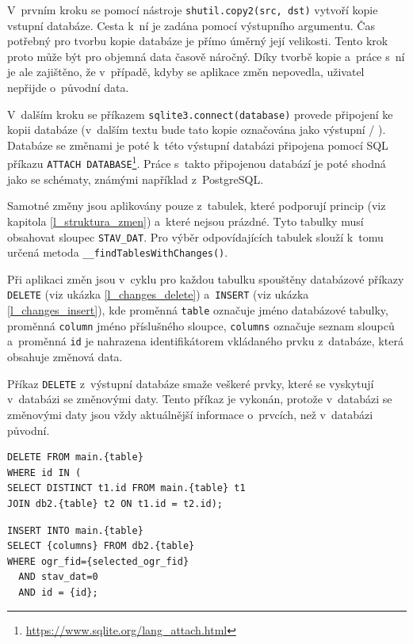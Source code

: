 \documentclass[a4paper,12pt,oneside]{book}
\begin{document}
V~prvním kroku se pomocí nástroje \texttt{shutil.copy2(src, dst)}
vytvoří kopie vstupní databáze. Cesta k~ní je zadána pomocí výstupního
argumentu. Čas potřebný pro tvorbu kopie databáze je přímo úměrný její
velikosti. Tento krok proto může být pro objemná data časově
náročný. Díky tvorbě kopie a~práce s~ní je ale zajištěno, že
v~případě, kdyby se aplikace změn nepovedla, uživatel nepřijde
o~původní data.

V~dalším kroku se příkazem \texttt{sqlite3.connect(database)} provede
připojení ke kopii databáze (v~dalším textu bude tato kopie označována
jako výstupní / ). Databáze se změnami je poté k~této výstupní
databázi připojena pomocí SQL příkazu \texttt{ATTACH
  DATABASE}\footnote{\url{https://www.sqlite.org/lang\_attach.html}}. Práce
s~takto připojenou databází je poté shodná jako se schématy, známými
například z~PostgreSQL.

Samotné změny jsou aplikovány pouze z~tabulek, které podporují princip
 (viz kapitola \ref{l_struktura_zmen}) a~které nejsou
prázdné. Tyto tabulky musí obsahovat sloupec \texttt{STAV\_DAT}. Pro
výběr odpovídajících tabulek slouží k~tomu určená metoda
\texttt{\_\_findTablesWithChanges()}.

Při aplikaci změn jsou v~cyklu pro každou tabulku spouštěny databázové
příkazy \texttt{DELETE} (viz ukázka \ref{l_changes_delete})
a~\texttt{INSERT} (viz ukázka \ref{l_changes_insert}), kde proměnná
\texttt{table} označuje jméno databázové tabulky, proměnná
\texttt{column} jméno příslušného sloupce, \texttt{columns} označuje
seznam sloupců a~proměnná \texttt{id} je nahrazena identifikátorem
vkládaného prvku z~databáze, která obsahuje změnová data.

Příkaz \texttt{DELETE} z~výstupní databáze smaže veškeré prvky, které se
vyskytují v~databázi se změnovými daty. Tento příkaz je vykonán,
protože v~databázi se změnovými daty jsou vždy aktuálnější informace
o~prvcích, než v~databázi původní.

{\scriptsize
\begin{lstlisting}[style=sql, caption={Aplikace změn -- příkaz DELETE}, 
		    label=l_changes_delete]
DELETE FROM main.{table}
WHERE id IN (
SELECT DISTINCT t1.id FROM main.{table} t1
JOIN db2.{table} t2 ON t1.id = t2.id);
\end{lstlisting}

\begin{lstlisting}[style=sql, 
		    caption={Aplikace změn -- příkaz INSERT}, 
		    label=l_changes_insert]
INSERT INTO main.{table}
SELECT {columns} FROM db2.{table}
WHERE ogr_fid={selected_ogr_fid}
  AND stav_dat=0
  AND id = {id};
\end{lstlisting}
}
\end{document}
